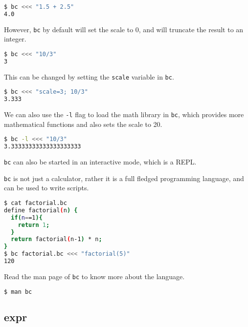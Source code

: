 \begin{lstlisting}[language=bash]
$ bc <<< "1.5 + 2.5"
4.0
\end{lstlisting}

However, \lstinline|bc| by default will set the scale to 0, and will truncate the result to an integer.

\begin{lstlisting}[language=bash]
$ bc <<< "10/3"
3
\end{lstlisting}

This can be changed by setting the \lstinline|scale| variable in \lstinline|bc|.

\begin{lstlisting}[language=bash]
$ bc <<< "scale=3; 10/3"
3.333
\end{lstlisting}

We can also use the \lstinline|-l| flag to load the math library in \lstinline|bc|,
which provides more mathematical functions and also sets the scale to 20.

\begin{lstlisting}[language=bash]
$ bc -l <<< "10/3"
3.33333333333333333333
\end{lstlisting}

\lstinline|bc| can also be started in an interactive mode, which is a REPL.

\lstinline|bc| is not just a calculator, rather it is a full fledged programming language, and can be used to write scripts.

\begin{lstlisting}[language=bash]
$ cat factorial.bc
define factorial(n) {
  if(n==1){
    return 1;
  }
  return factorial(n-1) * n;
}
$ bc factorial.bc <<< "factorial(5)"
120
\end{lstlisting}

Read the man page of \lstinline|bc| to know more about the language.

\begin{lstlisting}[language=bash]
$ man bc
\end{lstlisting}

\subsection{expr}

